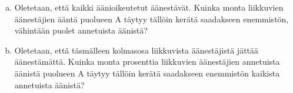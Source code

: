 \begin{description}
	\begin{enumerate}[(a)]
		\item Oletetaan, että kaikki äänioikeutetut äänestävät. Kuinka monta liikkuvien äänestäjien ääntä puolueen A täytyy tällöin kerätä saadakseen enemmistön, vähintään puolet annetuista äänistä?
		\item Oletetaan, että täsmälleen kolmasosa liikkuvista äänestäjistä jättää äänestämättä. Kuinka monta prosenttia liikkuvien äänestäjien annetuista äänistä puolueen A täytyy tällöin kerätä saadakseen enemmistön kaikista annetuista äänistä?
	\end{enumerate}	 	
	
\end{description}

